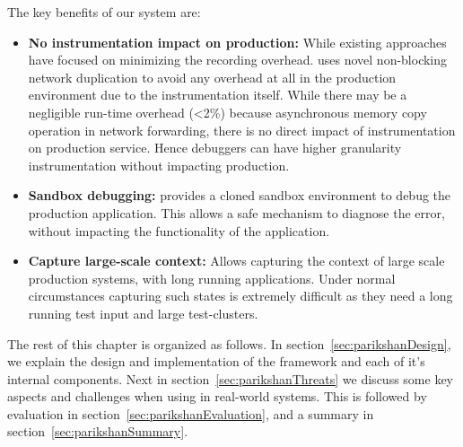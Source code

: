 \noindent
The key benefits of our system are:
\begin{itemize}[leftmargin=*,topsep=0pt,itemsep=-1ex,partopsep=1ex,parsep=1ex]
\item \textbf{No instrumentation impact on production:} While existing approaches have focused on minimizing the recording overhead. \parikshan uses novel non-blocking network duplication to avoid any overhead at all in the production environment due to the instrumentation itself.	While there may be a negligible run-time overhead (\textless 2\%) because asynchronous memory copy operation in network forwarding, there is no direct impact of instrumentation on production service. 
	Hence debuggers can have higher granularity instrumentation without impacting production.
\item \textbf{Sandbox debugging:} \parikshan provides a cloned sandbox environment to debug the production application.
This allows a safe mechanism to diagnose the error, without impacting the functionality of the application.
\item \textbf{Capture large-scale context:} Allows capturing the context of large scale production systems, with long running applications. Under normal circumstances capturing such states is extremely difficult as they need a long running test input and large test-clusters.
\end{itemize}

The rest of this chapter is organized as follows. 
In section~\ref{sec:parikshanDesign}, we explain the design and implementation of the \parikshan framework and each of it's internal components.
Next in section~\ref{sec:parikshanThreats} we discuss some key aspects and challenges when using \parikshan in real-world systems.
This is followed by evaluation in section~\ref{sec:parikshanEvaluation}, and a summary in section~\ref{sec:parikshanSummary}.

